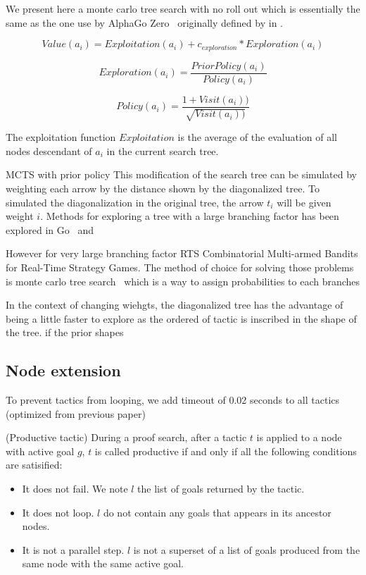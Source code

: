 \documentclass[runningheads,a4paper,draft]{svjour3}
\begin{document}
We present here a monte carlo tree search with no roll out which is essentially 
the same as the one use by AlphaGo Zero~\cite{} originally defined by \cite{} 
in \cite{}.

\[Value(a_i) = Exploitation(a_i) + c_{exploration} * Exploration(a_i)\] 

\[Exploration(a_i) = \frac{PriorPolicy(a_i)}{Policy(a_i)}\]

\[Policy(a_i) = \frac{1 + Visit(a_i))}{\sqrt{Visit(a_i))}}\]

The exploitation function $Exploitation$ is the average of the evaluation of 
all nodes descendant of $a_i$ in the current search tree.  


MCTS with prior policy
This modification of the search tree can be simulated by weighting each arrow 
by the distance shown by the diagonalized tree. To simulated the 
diagonalization in the original tree, the arrow $t_i$ will be given weight $i$.
Methods for exploring a tree with a large branching factor has been explored  
in Go~\cite{alphago} and 

However for very large branching factor RTS Combinatorial Multi-armed Bandits
for Real-Time Strategy Games. The method of choice for solving those 
problems 
is monte carlo tree search~\cite{mcts} which is a way to assign probabilities 
to each branches

In the context of changing wiehgts, the diagonalized tree has the advantage of 
being a little faster to explore as the ordered of tactic is inscribed in the 
shape of the tree. if the prior shapes 



\subsection{Node extension}

To prevent tactics from looping, we add timeout of 0.02 seconds to all tactics 
(optimized from previous paper)

\begin{definition} (Productive tactic)
During a proof search, after a tactic $t$ is applied to a node with active goal 
$g$, 
$t$ is called 
productive if and only if all the following conditions are satisified:
\begin{itemize}
\item It does not fail. We note $l$ the list of goals returned by the tactic.
\item It does not loop. $l$ do not contain any goals that appears in its 
ancestor nodes.
\item It is not a parallel step. $l$ is not a superset of a list of goals 
produced from the same node with the same active goal.
\end{itemize}





\end{definition}
\end{document}
